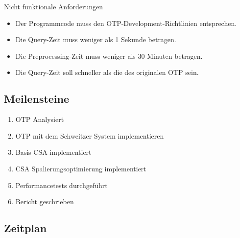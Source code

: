 Nicht funktionale Anforderungen
\begin{itemize}
	\item Der Programmcode muss den OTP-Development-Richtlinien entsprechen.
	\item Die Query-Zeit muss weniger als 1 Sekunde betragen.
	\item Die Preprocessing-Zeit muss weniger als 30 Minuten betragen.
	\item Die Query-Zeit soll schneller als die des originalen OTP sein.
\end{itemize}

\subsection{Meilensteine}
\label{Meilensteine}
\begin{enumerate}
	\item OTP Analysiert
	\item OTP mit dem Schweitzer System implementieren
	\item Basis CSA implementiert
	\item CSA Spalierungsoptimierung implementiert
	\item Performancetests durchgeführt
	\item Bericht geschrieben
\end{enumerate}

\subsection{Zeitplan}
\label{Zeitplan}
